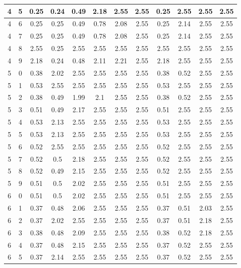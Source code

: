 \begin{longtable}{|c|c||c||c|c|c|c|c||c|c|c|c|}
	4 & 5 & 0.25 & 0.24 & 0.49 & 2.18 & 2.55 & 2.55 & 0.25 & 2.55 & 2.55 & 2.55 \\ \hline
	4 & 6 & 0.25 & 0.25 & 0.49 & 0.78 & 2.08 & 2.55 & 0.25 & 2.14 & 2.55 & 2.55 \\ \hline
	4 & 7 & 0.25 & 0.25 & 0.49 & 0.78 & 2.08 & 2.55 & 0.25 & 2.14 & 2.55 & 2.55 \\ \hline
	4 & 8 & 2.55 & 0.25 & 2.55 & 2.55 & 2.55 & 2.55 & 2.55 & 2.55 & 2.55 & 2.55 \\ \hline
	4 & 9 & 2.18 & 0.24 & 0.48 & 2.11 & 2.21 & 2.55 & 2.18 & 2.55 & 2.55 & 2.55 \\ \hline
	5 & 0 & 0.38 & 2.02 & 2.55 & 2.55 & 2.55 & 2.55 & 0.38 & 0.52 & 2.55 & 2.55 \\ \hline
	5 & 1 & 0.53 & 2.55 & 2.55 & 2.55 & 2.55 & 2.55 & 0.53 & 2.55 & 2.55 & 2.55 \\ \hline
	5 & 2 & 0.38 & 0.49 & 1.99 & 2.1 & 2.55 & 2.55 & 0.38 & 0.52 & 2.55 & 2.55 \\ \hline
	5 & 3 & 0.51 & 0.49 & 2.17 & 2.55 & 2.55 & 2.55 & 0.51 & 2.55 & 2.55 & 2.55 \\ \hline
	5 & 4 & 0.53 & 2.13 & 2.55 & 2.55 & 2.55 & 2.55 & 0.53 & 2.55 & 2.55 & 2.55 \\ \hline
	5 & 5 & 0.53 & 2.13 & 2.55 & 2.55 & 2.55 & 2.55 & 0.53 & 2.55 & 2.55 & 2.55 \\ \hline
	5 & 6 & 0.52 & 2.55 & 2.55 & 2.55 & 2.55 & 2.55 & 0.52 & 2.55 & 2.55 & 2.55 \\ \hline
	5 & 7 & 0.52 & 0.5 & 2.18 & 2.55 & 2.55 & 2.55 & 0.52 & 2.55 & 2.55 & 2.55 \\ \hline
	5 & 8 & 0.52 & 0.49 & 2.15 & 2.55 & 2.55 & 2.55 & 0.52 & 2.55 & 2.55 & 2.55 \\ \hline
	5 & 9 & 0.51 & 0.5 & 2.02 & 2.55 & 2.55 & 2.55 & 0.51 & 2.55 & 2.55 & 2.55 \\ \hline
	6 & 0 & 0.51 & 0.5 & 2.02 & 2.55 & 2.55 & 2.55 & 0.51 & 2.55 & 2.55 & 2.55 \\ \hline
	6 & 1 & 0.37 & 0.48 & 2.06 & 2.55 & 2.55 & 2.55 & 0.37 & 0.51 & 2.03 & 2.55 \\ \hline
	6 & 2 & 0.37 & 2.02 & 2.55 & 2.55 & 2.55 & 2.55 & 0.37 & 0.51 & 2.18 & 2.55 \\ \hline
	6 & 3 & 0.38 & 0.48 & 2.09 & 2.55 & 2.55 & 2.55 & 0.38 & 0.52 & 2.18 & 2.55 \\ \hline
	6 & 4 & 0.37 & 0.48 & 2.15 & 2.55 & 2.55 & 2.55 & 0.37 & 0.52 & 2.55 & 2.55 \\ \hline
	6 & 5 & 0.37 & 2.14 & 2.55 & 2.55 & 2.55 & 2.55 & 0.37 & 0.52 & 2.55 & 2.55 \\ \hline

\end{longtable}
